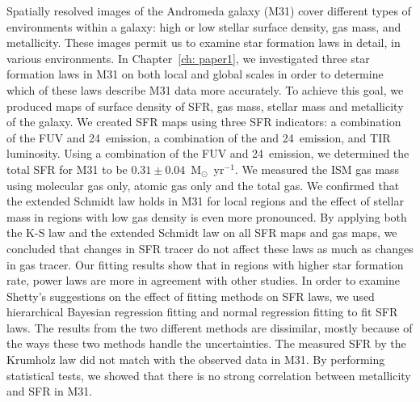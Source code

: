 Spatially resolved images of the Andromeda galaxy (M31) cover different types of environments within a galaxy: high or low stellar surface density, gas mass, and metallicity.
These images permit us to examine star formation laws in detail, in various environments.
In Chapter~\ref{ch: paper1}, we investigated three star formation laws in M31 on both local and global scales in order to determine which of these laws describe M31 data more accurately.
To achieve this goal, we produced maps of surface density of SFR, gas mass, stellar mass and metallicity of the galaxy.
We created SFR maps using three SFR indicators: a combination of the FUV and 24~\um emission, a combination of the \halpha and 24~\um emission, and TIR luminosity. 
Using a combination of the FUV and 24~\um emission, we determined the total SFR for M31 to be $0.31\pm 0.04$~M$_\odot$~yr$^{−1}$.
We measured the ISM gas mass using molecular gas only, atomic gas only and the total gas.
We confirmed that the extended Schmidt law holds in M31 for local regions and the effect of stellar mass in regions with low gas density is even more pronounced. 
By applying both the K-S law and the extended Schmidt law on all SFR maps and gas maps, we concluded that changes in SFR tracer do not affect these laws as much as changes in gas tracer.
Our fitting results show that in regions with higher star formation rate, power laws are more in agreement with other studies.
In order to examine Shetty's suggestions on the effect of fitting methods on SFR laws, we used hierarchical Bayesian regression fitting and normal regression fitting to fit SFR laws.
The results from the two different methods are dissimilar, mostly because of the ways these two methods handle the uncertainties.
The measured SFR by the Krumholz law did not match with the observed data in M31.
By performing statistical tests, we showed that there is no strong correlation between metallicity and SFR in M31.


